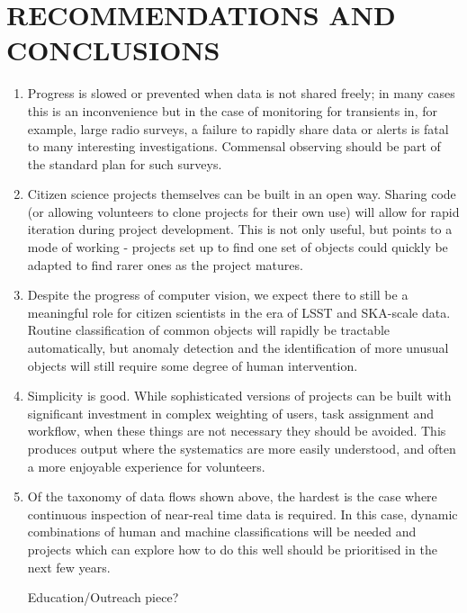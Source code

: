 \documentclass{pasa}
\begin{document}
\section{RECOMMENDATIONS AND CONCLUSIONS}
\label{sec:conclusions}

\begin{enumerate} 

\item Progress is slowed or prevented when data is not shared freely; in many cases this is an inconvenience but in the case of monitoring for transients in, for example, large radio surveys, a failure to rapidly share data or alerts is fatal to many interesting investigations. Commensal observing should be part of the standard plan for such surveys.

\item Citizen science projects themselves can be built in an open way. Sharing code (or allowing volunteers to clone projects for their own use) will allow for rapid iteration during project development. This is not only useful, but points to a mode of working - projects set up to find one set of objects could quickly be adapted to find rarer ones as the project matures. 

\item Despite the progress of computer vision, we expect there to still be a meaningful role for citizen scientists in the era of LSST and SKA-scale data. Routine classification of common objects will rapidly be tractable automatically, but anomaly detection and the identification of more unusual objects will still require some degree of human intervention. 

\item Simplicity is good. While sophisticated versions of projects can be built with significant investment in complex weighting of users, task assignment and workflow, when these things are not necessary they should be avoided. This produces output where the systematics are more easily understood, and often a more enjoyable experience for volunteers. 

\item Of the taxonomy of data flows shown above, the hardest is the case where continuous inspection of near-real time data is required. In this case, dynamic combinations of human and machine classifications will be needed and projects which can explore how to do this well should be prioritised in the next few years.

\item [Education/Outreach piece?]

\end{enumerate} 
\end{document}
